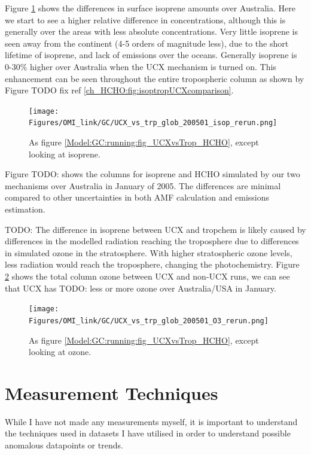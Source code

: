       Figure \ref{Model:GC:running:fig_UCXvsTrop_Isop} shows the differences in surface isoprene amounts over Australia.
      Here we start to see a higher relative difference in concentrations, although this is generally over the areas with less absolute concentrations. 
      Very little isoprene is seen away from the continent (4-5 orders of magnitude less), due to the short lifetime of isoprene, and lack of emissions over the oceans.
      Generally isoprene is 0-30\% higher over Australia when the UCX mechanism is turned on.
      This enhancement can be seen throughout the entire tropospheric column as shown by Figure TODO fix ref \ref{ch_HCHO:fig:isoptropUCXcomparison}. %
      \begin{figure}%
        \texttt{[image: Figures/OMI\_link/GC/UCX\_vs\_trp\_glob\_200501\_isop\_rerun.png]}
        \caption{ %
          As figure \ref{Model:GC:running:fig_UCXvsTrop_HCHO}, except looking at isoprene. 
        }      
        \label{Model:GC:running:fig_UCXvsTrop_Isop}
      \end{figure}
      
      
      Figure TODO: shows the columns for isoprene and HCHO simulated by our two mechanisms over Australia in January of 2005.
      The differences are minimal compared to other uncertainties in both AMF calculation and emissions estimation.
      
      
      TODO: The difference in isoprene between UCX and tropchem is likely caused by differences in the modelled radiation reaching the troposphere due to differences in simulated ozone in the stratosphere.
      With higher stratospheric ozone levels, less radiation would reach the troposphere, changing the photochemistry.
      Figure \ref{Model:GC:running:fig_UCXvsTrop_O3} shows the total column ozone between UCX and non-UCX runs, we can see that UCX has TODO: less or more ozone over Australia/USA in January.
          
      \begin{figure}%
        \texttt{[image: Figures/OMI\_link/GC/UCX\_vs\_trp\_glob\_200501\_O3\_rerun.png]}
        \caption{%
          As figure \ref{Model:GC:running:fig_UCXvsTrop_HCHO}, except looking at ozone. 
        }
        \label{Model:GC:running:fig_UCXvsTrop_O3}
      \end{figure}




\section{Measurement Techniques}
  \label{Model:Meas}
  While I have not made any measurements myself, it is important to understand the techniques used in datasets I have utilised in order to understand possible anomalous datapoints or trends.
  
